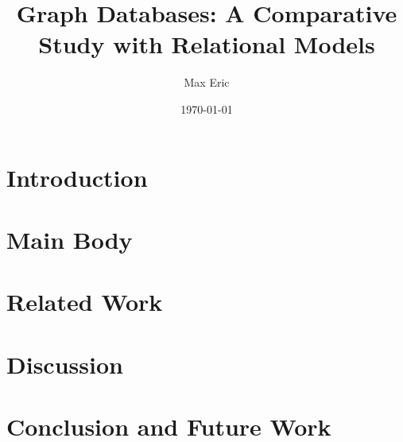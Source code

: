 \documentclass[12pt, a4paper]{article}
\title{Graph Databases: A Comparative Study with Relational Models}
\author{Max Eric}
\date{\today}
\begin{document}
\maketitle

\begin{abstract}

\end{abstract}

\section{Introduction}


\section{Main Body}


\section{Related Work}


\section{Discussion}


\section{Conclusion and Future Work}

\end{document}
